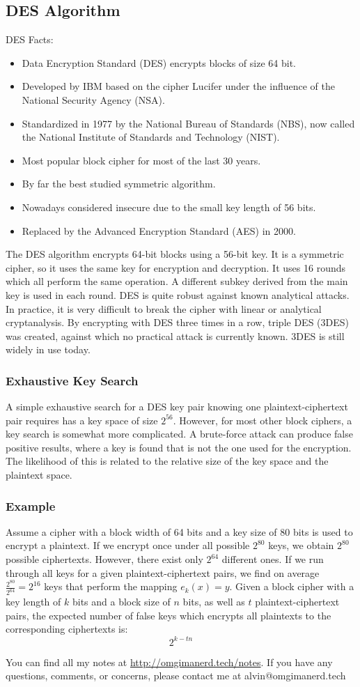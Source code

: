 \documentclass{math}
\begin{document}
\subsection*{DES Algorithm}
DES Facts:
\begin{itemize}
  \item Data Encryption Standard (DES) encrypts blocks of size 64 bit.
  \item Developed by IBM based on the cipher Lucifer under the influence of the
  National Security Agency (NSA).
  \item Standardized in 1977 by the National Bureau of Standards (NBS), now
  called the National Institute of Standards and Technology (NIST).
  \item Most popular block cipher for most of the last 30 years.
  \item By far the best studied symmetric algorithm.
  \item Nowadays considered insecure due to the small key length of 56 bits.
  \item Replaced by the Advanced Encryption Standard (AES) in 2000.
\end{itemize}
The DES algorithm encrypts 64-bit blocks using a 56-bit key. It is a symmetric
cipher, so it uses the same key for encryption and decryption. It uses 16 rounds
which all perform the same operation. A different subkey derived from the main
key is used in each round. DES is quite robust against known analytical attacks.
In practice, it is very difficult to break the cipher with linear or analytical
cryptanalysis. By encrypting with DES three times in a row, triple DES (3DES)
was created, against which no practical attack is currently known. 3DES is still
widely in use today.

\subsubsection*{Exhaustive Key Search}
A simple exhaustive search for a DES key pair knowing one plaintext-ciphertext
pair requires has a key space of size \( 2^56 \). However, for most other block
ciphers, a key search is somewhat more complicated. A brute-force attack can
produce false positive results, where a key is found that is not the one used
for the encryption. The likelihood of this is related to the relative size of
the key space and the plaintext space.

\subsubsection*{Example}
Assume a cipher with a block width of 64 bits and a key size of 80 bits is used
to encrypt a plaintext. If we encrypt once under all possible \( 2^80 \) keys,
we obtain \( 2^80 \) possible ciphertexts. However, there exist only \( 2^64 \)
different ones. If we run through all keys for a given plaintext-ciphertext
pairs, we find on average \( \frac{2^80}{2^64} = 2^16 \) keys that perform the
mapping \( e_k(x) = y \). Given a block cipher with a key length of \( k \)
bits and a block size of \( n \) bits, as well as \( t \) plaintext-ciphertext
pairs, the expected number of false keys which encrypts all plaintexts to the
corresponding ciphertexts is:
\[ 2^{k-tn} \]


\begin{center}
  You can find all my notes at \url{http://omgimanerd.tech/notes}. If you have
  any questions, comments, or concerns, please contact me at
  alvin@omgimanerd.tech
\end{center}
\end{document}

